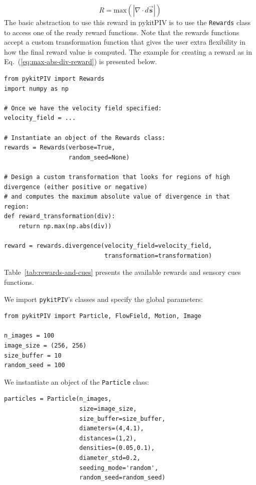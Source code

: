 \documentclass[a4paper,fleqn]{cas-dc}
\newcommand{ \kamila}[1]{\color{blue}{Kamila: #1} \color{black}}
\begin{document}
\begin{equation} \label{eq:max-abs-div-reward}
R = \text{max} ( |\nabla \cdot d\vec{\mathbf{s}} | ) 
\end{equation}
The basic abstraction to use this reward in pykitPIV is to use the \texttt{Rewards} class to access one of the ready reward functions. Note that the rewards functions accept a custom transformation function that gives the user extra flexibility in how the final reward value is computed. The example for creating a reward as in Eq.~(\ref{eq:max-abs-div-reward}) is presented below.
\lstset{language=Python}
\begin{lstlisting}
from pykitPIV import Rewards
import numpy as np

# Once we have the velocity field specified:
velocity_field = ...

# Instantiate an object of the Rewards class:
rewards = Rewards(verbose=True,
                  random_seed=None)
                  
# Design a custom transformation that looks for regions of high divergence (either positive or negative)
# and computes the maximum absolute value of divergence in that region:
def reward_transformation(div):
    return np.max(np.abs(div))
    
reward = rewards.divergence(velocity_field=velocity_field,
                            transformation=transformation)
\end{lstlisting}


Table~\ref{tab:rewards-and-cues} presents the available rewards and sensory cues functions.




\kamila{Here we can describe what can be achieved in terms of training an RL agent, e.g. in the context of autonomous experimentation.}

We import \texttt{pykitPIV}'s classes and specify the global parameters:
\lstset{language=Python}
\begin{lstlisting}
from pykitPIV import Particle, FlowField, Motion, Image

n_images = 100
image_size = (256, 256)
size_buffer = 10
random_seed = 100
\end{lstlisting}
We instantiate an object of the \texttt{Particle} class:
\lstset{language=Python}
\begin{lstlisting}
particles = Particle(n_images,
                     size=image_size,
                     size_buffer=size_buffer,
                     diameters=(4,4.1),
                     distances=(1,2),
                     densities=(0.05,0.1),
                     diameter_std=0.2,
                     seeding_mode='random',
                     random_seed=random_seed)
\end{lstlisting}
\end{document}
